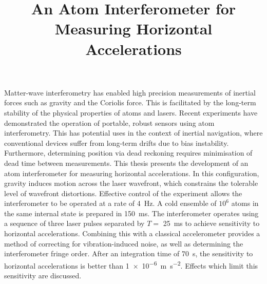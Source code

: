 \documentclass{article}
\title{An Atom Interferometer for Measuring Horizontal Accelerations}
\date{}
\newcommand{\sivalue}[2]{\SI[mode=text]{#1}{#2}}
\begin{document}
\maketitle
Matter-wave interferometry has enabled high precision measurements of
    inertial forces such as gravity and the
    Coriolis force. This is facilitated by the long-term stability of
    the physical properties of atoms and lasers. Recent experiments have
    demonstrated the operation of portable, robust sensors using atom
    interferometry. This has potential uses in the context of inertial
    navigation, where conventional devices suffer from long-term
    drifts due to bias instability. Furthermore, determining position
    via dead reckoning requires minimisation of dead time between
    measurements. This thesis presents the development of an atom
    interferometer for measuring horizontal accelerations. In this
    configuration, gravity induces motion across
    the laser wavefront, which constrains the tolerable level of
    wavefront distortions. Effective control of the experiment allows
    the interferometer to be operated at a rate of \sivalue{4}{\Hz}. A cold ensemble of $10^6$ atoms in the same
    internal state is prepared in \sivalue{150}{\ms}. The
    interferometer operates
    using a sequence of three laser pulses separated by
    $T=$ \sivalue{25}{\ms} to achieve sensitivity
    to horizontal accelerations. Combining this with a classical
    accelerometer provides a method of correcting for
    vibration-induced noise, as well as determining the interferometer
    fringe order. After an integration time of \sivalue{70}{\s}, the
    sensitivity to horizontal accelerations is better than
    \sivalue{1e-6}{\m\s\tothe{-2}}. Effects which limit this
    sensitivity are discussed.
  
\end{document}
